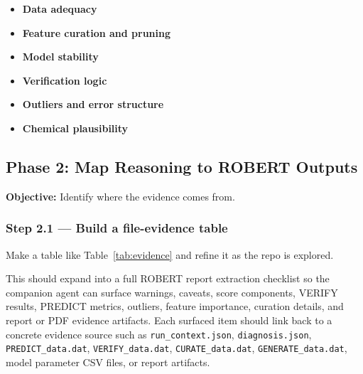 \documentclass[11pt]{article}
\begin{document}
\begin{itemize}
    \item \textbf{Data adequacy}
    \item \textbf{Feature curation and pruning}
    \item \textbf{Model stability}
    \item \textbf{Verification logic}
    \item \textbf{Outliers and error structure}
    \item \textbf{Chemical plausibility}
\end{itemize}

\subsection{Phase 2: Map Reasoning to ROBERT Outputs}
\textbf{Objective:} Identify where the evidence comes from.

\subsubsection*{Step 2.1 --- Build a file-evidence table}
Make a table like Table~\ref{tab:evidence} and refine it as the repo is explored.

This should expand into a full ROBERT report extraction checklist so the companion agent
can surface warnings, caveats, score components, VERIFY results, PREDICT metrics,
outliers, feature importance, curation details, and report or PDF evidence artifacts.
Each surfaced item should link back to a concrete evidence source such as
\texttt{run\_context.json}, \texttt{diagnosis.json}, \texttt{PREDICT\_data.dat},
\texttt{VERIFY\_data.dat}, \texttt{CURATE\_data.dat}, \texttt{GENERATE\_data.dat},
model parameter CSV files, or report artifacts.
\end{document}
